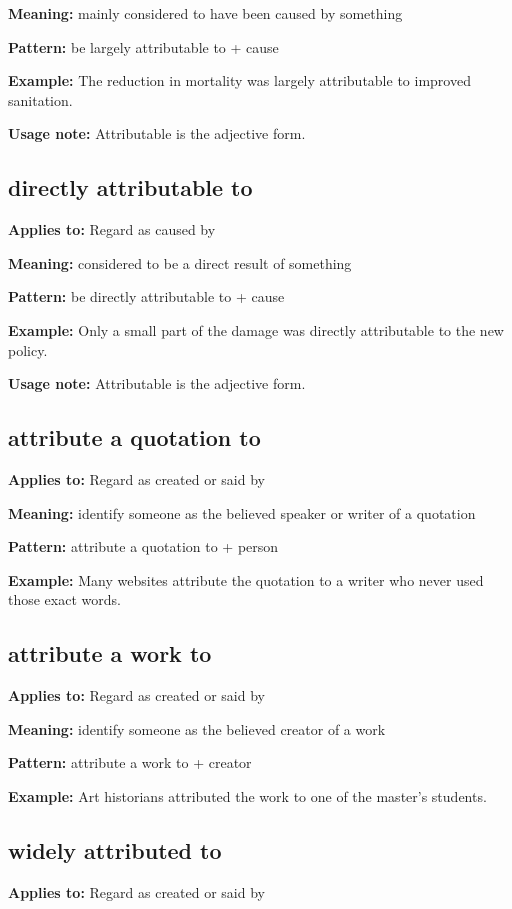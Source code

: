 \documentclass[11pt]{article}
\begin{document}
\textbf{Meaning:} mainly considered to have been caused by something

\textbf{Pattern:} be largely attributable to + cause

\textbf{Example:} The reduction in mortality was largely attributable to improved sanitation.

\textbf{Usage note:} Attributable is the adjective form.

\subsection{directly attributable to}
\textbf{Applies to:} Regard as caused by

\textbf{Meaning:} considered to be a direct result of something

\textbf{Pattern:} be directly attributable to + cause

\textbf{Example:} Only a small part of the damage was directly attributable to the new policy.

\textbf{Usage note:} Attributable is the adjective form.

\subsection{attribute a quotation to}
\textbf{Applies to:} Regard as created or said by

\textbf{Meaning:} identify someone as the believed speaker or writer of a quotation

\textbf{Pattern:} attribute a quotation to + person

\textbf{Example:} Many websites attribute the quotation to a writer who never used those exact words.

\subsection{attribute a work to}
\textbf{Applies to:} Regard as created or said by

\textbf{Meaning:} identify someone as the believed creator of a work

\textbf{Pattern:} attribute a work to + creator

\textbf{Example:} Art historians attributed the work to one of the master's students.

\subsection{widely attributed to}
\textbf{Applies to:} Regard as created or said by
\end{document}
